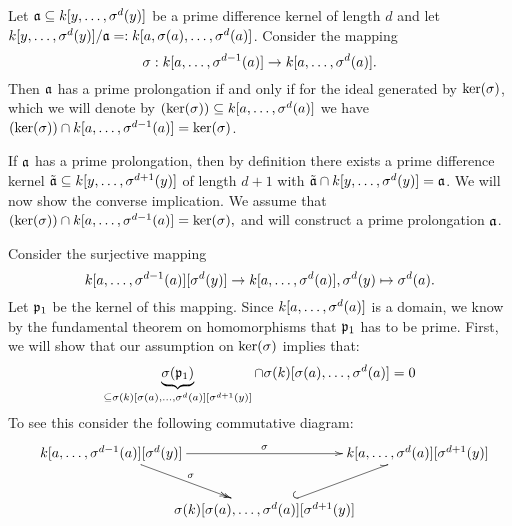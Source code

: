  
\begin{prop}
Let $\mathfrak{a} \subseteq k[y,\ldots,\sigma^d(y)]$ be a prime difference kernel of length $d$ and let $k[y,\ldots,\sigma^d(y)]/\mathfrak{a} =: k[a,\sigma(a),\ldots,\sigma^d(a)]$. Consider the mapping 
\[ \sigma: k[a,\ldots,\sigma^{d-1}(a)] \rightarrow k[a,\ldots,\sigma^d(a)]. \]
Then $\mathfrak{a}$ has a prime prolongation if and only if for the ideal generated by $\operatorname{ker}(\sigma)$, which we will denote by $(\operatorname{ker}(\sigma)) \subseteq k[a,\ldots,\sigma^d(a)]$ we have $(\operatorname{ker}(\sigma)) \cap k[a,\ldots,\sigma^{d-1}(a)] = \operatorname{ker}(\sigma)$. 
\begin{bew}
If $\mathfrak{a}$ has a prime prolongation, then by definition there exists a prime difference kernel $\tilde {\mathfrak{a}} \subseteq k[y,\ldots,\sigma^{d+1}(y)]$ of length $d+1$ with $\tilde {\mathfrak{a}} \cap k[y,\ldots,\sigma^d(y)] = \mathfrak{a}$.
We will now show the converse implication. We assume that $(\operatorname{ker}(\sigma)) \cap k[a,\ldots,\sigma^{d-1}(a)] = \operatorname{ker}(\sigma),$ and will construct a prime prolongation $\mathfrak{a}$.

Consider the surjective mapping 
\[ k[a,\ldots,\sigma^{d-1}(a)][\sigma^d(y)] \rightarrow k[a,\ldots,\sigma^d(a)], \sigma^d(y) \mapsto \sigma^d(a). \]
Let $\mathfrak{p}_1$ be the kernel of this mapping. Since $k[a,\ldots,\sigma^d(a)]$ is a domain, we know by the fundamental theorem on homomorphisms that $\mathfrak{p}_1$ has to be prime. 
First, we will show that our assumption on $\operatorname{ker}(\sigma)$ implies that:
\begin{equation}\label{skercapsk} \underbrace{\sigma(\mathfrak{p}_1)}_{\subseteq \sigma(k)[\sigma(a),\ldots,\sigma^d(a)][\sigma^{d+1}(y)]} \cap \sigma(k)[\sigma(a),\ldots,\sigma^d(a)] = 0 \end{equation}
To see this consider the following commutative diagram:
\[
\begin{xy}
\xymatrixcolsep{-1pc}
 \xymatrix{
      k[a,\ldots,\s^{d-1}(a)][\s^d(y)] \ar[rr]^\s \ar@{->>}[rd]^\s  &     &  k[a,\ldots,\s^d(a)][\s^{d+1}(y)]   \\
      &  \s(k)[\s(a),\ldots,\s^d(a)][\s^{d+1}(y)] \ar@^{(->}[ur] &  }
\end{xy}
\]


\end{bew}
\end{prop}
